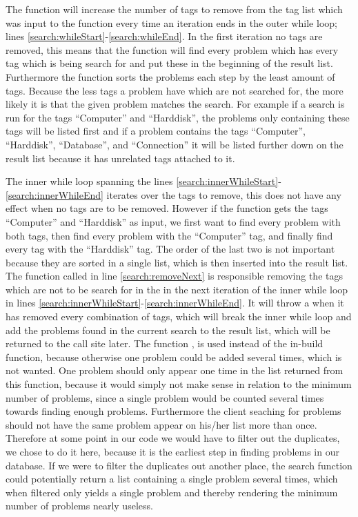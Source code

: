 The function will increase the number of tags to remove from the tag list which was input to the function every time an iteration ends in the outer while loop; lines \ref{search:whileStart}-\ref{search:whileEnd}.
In the first iteration no tags are removed, this means that the function will find every problem which has every tag which is being search for and put these in the beginning of the result list.
Furthermore the function sorts the problems each step by the least amount of tags. Because the less tags a problem have which are not searched for, the more likely it is that the given problem matches the search.
For example if a search is run for the tags ``Computer'' and ``Harddisk'', the problems only containing these tags will be listed first and if a problem contains the tags ``Computer'', ``Harddisk'', ``Database'', and ``Connection'' it will be listed further down on the result list because it has unrelated tags attached to it.

The inner while loop spanning the lines \ref{search:innerWhileStart}-\ref{search:innerWhileEnd} iterates over the tags to remove, this does not have any effect when no tags are to be removed.
However if the function gets the tags ``Computer'' and ``Harddisk'' as input, we first want to find every problem with both tags, then find every problem with the ``Computer'' tag, and finally find every tag with the ``Harddisk'' tag.
The order of the last two is not important because they are sorted in a single list, which is then inserted into the result list.
The  function called in line \ref{search:removeNext} is responsible removing the tags which are not to be search for in the in the next iteration of the inner while loop in lines \ref{search:innerWhileStart}-\ref{search:innerWhileEnd}.
It will throw a  when it has removed every combination of tags, which will break the inner while loop and add the problems found in the current search to the result list, which will be returned to the call site later.
The function , is used instead of the in-build  function, because otherwise one problem could be added several times, which is not wanted.
One problem should only appear one time in the list returned from this function, because it would simply not make sense in relation to the minimum number of problems, since a single problem would be counted several times towards finding enough problems.
Furthermore the client seaching for problems should not have the same problem appear on his/her list more than once.
Therefore at some point in our code we would have to filter out the duplicates, we chose to do it here, because it is the earliest step in finding problems in our database.
If we were to filter the duplicates out another place, the search function could potentially return a list containing a single problem several times, which when filtered only yields a single problem and thereby rendering the minimum number of problems nearly useless.

